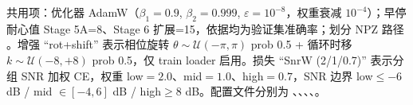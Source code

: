 共用项：优化器 AdamW（\(\beta_1{=}0.9\), \(\beta_2{=}0.999\), \(\varepsilon{=}10^{-8}\)，权重衰减 \(10^{-4}\)）；早停耐心值 Stage 5A=8、Stage 6 扩展=15，依据均为验证集准确率；划分 NPZ 路径 。增强 ``rot+shift'' 表示相位旋转 \(\theta\sim\mathcal{U}(-\pi,\pi)\) prob 0.5 + 循环时移 \(k\sim\mathcal{U}(-8,+8)\) prob 0.5，仅 train loader 启用。损失 ``SnrW (2/1/0.7)'' 表示分组 SNR 加权 CE，权重 low\(=2.0\)、mid\(=1.0\)、high\(=0.7\)，SNR 边界 low\(\le-6\) dB / mid \(\in[-4,6]\) dB / high\(\ge8\) dB。配置文件分别为 、、、、。
